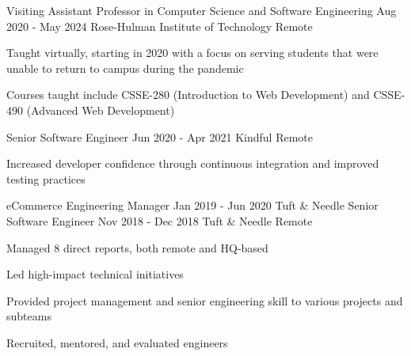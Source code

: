 \begin{cventries}
  \cventry
  {Visiting Assistant Professor in Computer Science and Software Engineering}
  {Aug 2020 - May 2024}
  {Rose-Hulman Institute of Technology}
  {Remote}
  {
    \begin{cvitems}
      \item Taught virtually, starting in 2020 with a focus on serving students that were unable to return to campus during the pandemic
      \item Courses taught include CSSE-280 (Introduction to Web Development) and CSSE-490 (Advanced Web Development)
    \end{cvitems}
    \cvtags{
      \tagCSS
      \tagHTML
      \tagJavaScript
      \tagPython
      \tagSASS
      \tagFlask
      \tagReact
      \tagAirtable
      \tagSQLite
      \tagFigma
      \tagTeaching
      \tagTDDShort
    }
  }

  \cventry
  {Senior Software Engineer}
  {Jun 2020 - Apr 2021}
  {Kindful}
  {Remote}
  {
    \begin{cvitems}
      \item Increased developer confidence through continuous integration and improved testing practices
    \end{cvitems}
    \cvtags{
      \tagRuby
      \tagRails
      \tagPostgreSQL
      \tagCIShort
      \tagTDDShort
    }
  }

  \doublecventry
  {eCommerce Engineering Manager}
  {Jan 2019 - Jun 2020}
  {Tuft \& Needle}
  {Senior Software Engineer}
  {Nov 2018 - Dec 2018}
  {Tuft \& Needle}
  {}
  {Remote}
  {
    \begin{cvitems}
      \item Managed 8 direct reports, both remote and HQ-based
      \item Led high-impact technical initiatives
      \item Provided project management and senior engineering skill to various projects and subteams
      \item Recruited, mentored, and evaluated engineers
    \end{cvitems}
    \cvtags{
      \tagRuby
      \tagRails
      \tagPostgreSQL
      \tagAccessibility
      \tagCIShort
      \tagTDDShort
      \tagPeopleManagement
      \tagProjectManagement
      \tagECommerce
    }
  }


\end{cventries}
